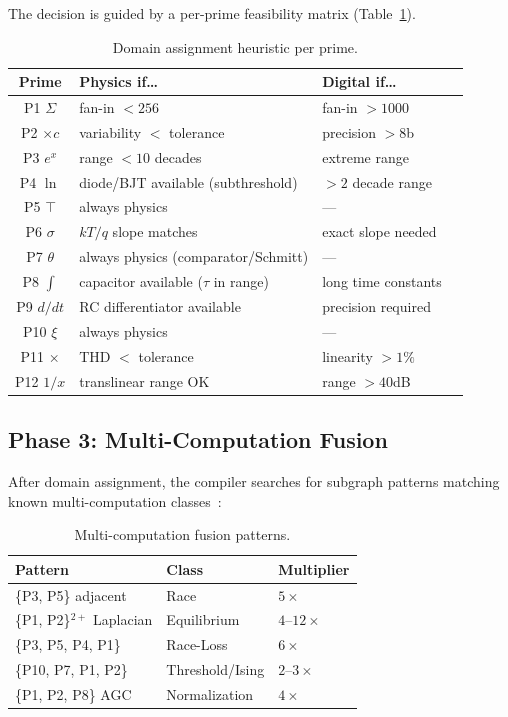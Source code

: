 \documentclass[11pt]{article}
\begin{document}
The decision is guided by a per-prime feasibility matrix (Table~\ref{tab:assignment}).

\begin{table}[h]
\centering
\caption{Domain assignment heuristic per prime.}
\label{tab:assignment}
\small
\begin{tabular}{clll}
\toprule
Prime & Physics if\ldots & Digital if\ldots \\
\midrule
P1 $\Sigma$ & fan-in $< 256$ & fan-in $> 1000$ \\
P2 $\times c$ & variability $<$ tolerance & precision $> 8$b \\
P3 $e^x$ & range $< 10$ decades & extreme range \\
P4 $\ln$ & diode/BJT available (subthreshold) & $> 2$ decade range \\
P5 $\top$ & always physics & --- \\
P6 $\sigma$ & $kT/q$ slope matches & exact slope needed \\
P7 $\theta$ & always physics (comparator/Schmitt) & --- \\
P8 $\int$ & capacitor available ($\tau$ in range) & long time constants \\
P9 $d/dt$ & RC differentiator available & precision required \\
P10 $\xi$ & always physics & --- \\
P11 $\times$ & THD $<$ tolerance & linearity $> 1\%$ \\
P12 $1/x$ & translinear range OK & range $> 40$dB \\
\bottomrule
\end{tabular}
\end{table}

\subsection{Phase 3: Multi-Computation Fusion}

After domain assignment, the compiler searches for subgraph patterns matching known multi-computation classes~\cite{bieg2026}:

\begin{table}[h]
\centering
\caption{Multi-computation fusion patterns.}
\label{tab:fusion}
\small
\begin{tabular}{lll}
\toprule
Pattern & Class & Multiplier \\
\midrule
\{P3, P5\} adjacent & Race & $5\times$ \\
\{P1, P2\}$^{2+}$ Laplacian & Equilibrium & $4$--$12\times$ \\
\{P3, P5, P4, P1\} & Race-Loss & $6\times$ \\
\{P10, P7, P1, P2\} & Threshold/Ising & $2$--$3\times$ \\
\{P1, P2, P8\} AGC & Normalization & $4\times$ \\
\bottomrule
\end{tabular}
\end{table}
\end{document}
